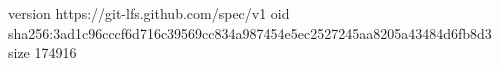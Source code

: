 version https://git-lfs.github.com/spec/v1
oid sha256:3ad1c96cccf6d716c39569cc834a987454e5ec2527245aa8205a43484d6fb8d3
size 174916

